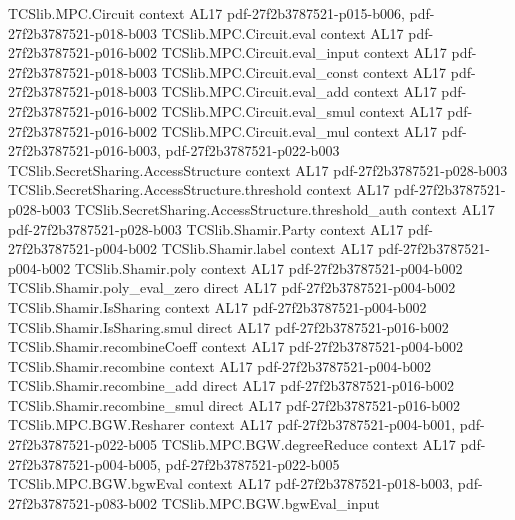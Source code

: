 \begin{theorem}
\label{TCSlib.MPC.BGW.bgwEval_smul}
\leanok
\proofstep
  {TCSlib.MPC.Circuit}
  {context}
  {AL17}
  {pdf-27f2b3787521-p015-b006,
    pdf-27f2b3787521-p018-b003}
\proofstep
  {TCSlib.MPC.Circuit.eval}
  {context}
  {AL17}
  {pdf-27f2b3787521-p016-b002}
\proofstep
  {TCSlib.MPC.Circuit.eval_input}
  {context}
  {AL17}
  {pdf-27f2b3787521-p018-b003}
\proofstep
  {TCSlib.MPC.Circuit.eval_const}
  {context}
  {AL17}
  {pdf-27f2b3787521-p018-b003}
\proofstep
  {TCSlib.MPC.Circuit.eval_add}
  {context}
  {AL17}
  {pdf-27f2b3787521-p016-b002}
\proofstep
  {TCSlib.MPC.Circuit.eval_smul}
  {context}
  {AL17}
  {pdf-27f2b3787521-p016-b002}
\proofstep
  {TCSlib.MPC.Circuit.eval_mul}
  {context}
  {AL17}
  {pdf-27f2b3787521-p016-b003,
    pdf-27f2b3787521-p022-b003}
\proofstep
  {TCSlib.SecretSharing.AccessStructure}
  {context}
  {AL17}
  {pdf-27f2b3787521-p028-b003}
\proofstep
  {TCSlib.SecretSharing.AccessStructure.threshold}
  {context}
  {AL17}
  {pdf-27f2b3787521-p028-b003}
\proofstep
  {TCSlib.SecretSharing.AccessStructure.threshold_auth}
  {context}
  {AL17}
  {pdf-27f2b3787521-p028-b003}
\proofstep
  {TCSlib.Shamir.Party}
  {context}
  {AL17}
  {pdf-27f2b3787521-p004-b002}
\proofstep
  {TCSlib.Shamir.label}
  {context}
  {AL17}
  {pdf-27f2b3787521-p004-b002}
\proofstep
  {TCSlib.Shamir.poly}
  {context}
  {AL17}
  {pdf-27f2b3787521-p004-b002}
\proofstep
  {TCSlib.Shamir.poly_eval_zero}
  {direct}
  {AL17}
  {pdf-27f2b3787521-p004-b002}
\proofstep
  {TCSlib.Shamir.IsSharing}
  {context}
  {AL17}
  {pdf-27f2b3787521-p004-b002}
\proofstep
  {TCSlib.Shamir.IsSharing.smul}
  {direct}
  {AL17}
  {pdf-27f2b3787521-p016-b002}
\proofstep
  {TCSlib.Shamir.recombineCoeff}
  {context}
  {AL17}
  {pdf-27f2b3787521-p004-b002}
\proofstep
  {TCSlib.Shamir.recombine}
  {context}
  {AL17}
  {pdf-27f2b3787521-p004-b002}
\proofstep
  {TCSlib.Shamir.recombine_add}
  {direct}
  {AL17}
  {pdf-27f2b3787521-p016-b002}
\proofstep
  {TCSlib.Shamir.recombine_smul}
  {direct}
  {AL17}
  {pdf-27f2b3787521-p016-b002}
\proofstep
  {TCSlib.MPC.BGW.Resharer}
  {context}
  {AL17}
  {pdf-27f2b3787521-p004-b001,
    pdf-27f2b3787521-p022-b005}
\proofstep
  {TCSlib.MPC.BGW.degreeReduce}
  {context}
  {AL17}
  {pdf-27f2b3787521-p004-b005,
    pdf-27f2b3787521-p022-b005}
\proofstep
  {TCSlib.MPC.BGW.bgwEval}
  {context}
  {AL17}
  {pdf-27f2b3787521-p018-b003,
    pdf-27f2b3787521-p083-b002}
\proofstep
  {TCSlib.MPC.BGW.bgwEval_input}

\end{theorem}
